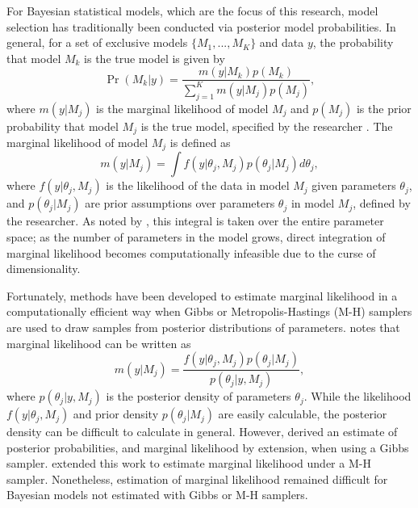 \documentclass[twocolumn]{article}
\begin{document}
For Bayesian statistical models, which are the focus of this research, model selection has traditionally been conducted via posterior model probabilities. In general, for a set of exclusive models $\{M_1, ..., M_K\}$ and data $y$, the probability that model $M_k$ is the true model is given by
\begin{equation}
	\Pr(M_k|y) = \frac{m(y|M_k)p(M_k)}{\sum_{j=1}^K m(y|M_j)p(M_j)},
\end{equation}
where $m(y|M_j)$ is the marginal likelihood of model $M_j$ and $p(M_j)$ is the prior probability that model $M_j$ is the true model, specified by the researcher \citep{KassRaftery}. The marginal likelihood of model $M_j$ is defined as
\begin{equation}
m(y|M_j) = \int f(y|\theta_j, M_j) p(\theta_j|M_j)d\theta_j,
\end{equation}
where $f(y|\theta_j, M_j)$ is the likelihood of the data in model $M_j$ given parameters $\theta_j$, and $p(\theta_j|M_j)$ are prior assumptions over parameters $\theta_j$ in model $M_j$, defined by the researcher. As noted by \cite{KassRaftery}, this integral is taken over the entire parameter space; as the number of parameters in the model grows, direct integration of marginal likelihood becomes computationally infeasible due to the curse of dimensionality.

Fortunately, methods have been developed to estimate marginal likelihood in a computationally efficient way when Gibbs or Metropolis-Hastings (M-H) samplers are used to draw samples from posterior distributions of parameters. \cite{Chib} notes that marginal likelihood can be written as 
\begin{equation}
	m(y|M_j) = \frac{f(y|\theta_j, M_j)p(\theta_j|M_j)}{p(\theta_j|y, M_j)},
\end{equation}
where $p(\theta_j|y, M_j)$ is the posterior density of parameters $\theta_j$. While the likelihood $f(y|\theta_j, M_j)$ and prior density $p(\theta_j|M_j)$ are easily calculable, the posterior density can be difficult to calculate in general. However, \cite{Chib} derived an estimate of posterior probabilities, and marginal likelihood by extension, when using a Gibbs sampler. \cite{ChibJeliazkov} extended this work to estimate marginal likelihood under a M-H sampler. Nonetheless, estimation of marginal likelihood remained difficult for Bayesian models not estimated with Gibbs or M-H samplers.
\end{document}
